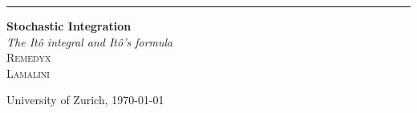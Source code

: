 \documentclass[11pt,a4paper, final]{article}
\begin{document}
\begin{titlepage} %
	
	\raggedleft %
	
	\rule{1pt}{\textheight} %
	\hspace{0.05\textwidth} %
	\parbox[b]{0.75\textwidth}{ %
		
		{\Huge\bfseries Stochastic Integration}\\[2\baselineskip] %
		{\large\textit{The Itô integral and Itô's formula}}\\[4\baselineskip] %
		{\Large\textsc{Remedyx \\
		Lamalini}} %
		
		\vspace{0.5\textheight} %
		
		{\noindent University of Zurich, \today }\\[\baselineskip] %
	}

\end{titlepage}
\end{document}
